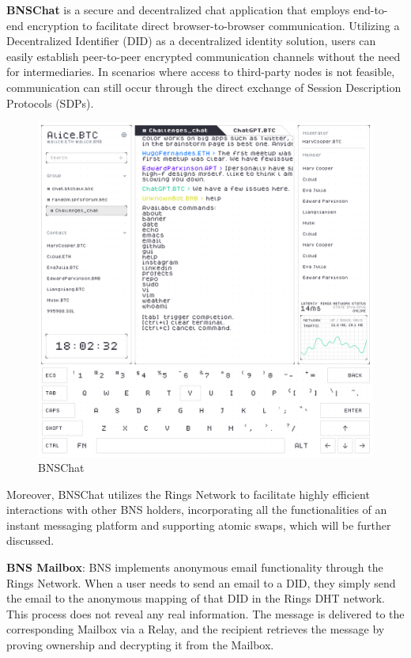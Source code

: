 \documentclass[twocolumn]{article}
\begin{document}
\textbf{BNSChat} is a secure and decentralized chat application that employs end-to-end encryption to facilitate direct browser-to-browser communication. Utilizing a Decentralized Identifier (DID) as a decentralized identity solution, users can easily establish peer-to-peer encrypted communication channels without the need for intermediaries. In scenarios where access to third-party nodes is not feasible, communication can still occur through the direct exchange of Session Description Protocols (SDPs).

\begin{figure}[htbp]
  \includegraphics[width=\linewidth]{imgs/chat.jpg}
  \caption{BNSChat}
  \label{diddoc}

\end{figure}
Moreover, BNSChat utilizes the Rings Network to facilitate highly efficient interactions with other BNS holders, incorporating all the functionalities of an instant messaging platform and supporting atomic swaps, which will be further discussed.

\textbf{BNS Mailbox}: BNS implements anonymous email functionality through the Rings Network. When a user needs to send an email to a DID, they simply send the email to the anonymous mapping of that DID in the Rings DHT network. This process does not reveal any real information. The message is delivered to the corresponding Mailbox via a Relay, and the recipient retrieves the message by proving ownership and decrypting it from the Mailbox.
\end{document}
